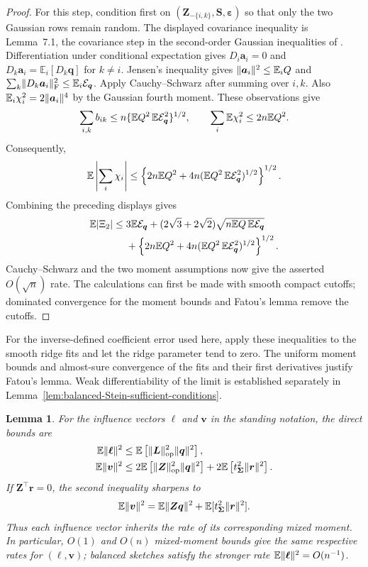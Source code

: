 \documentclass{article}
\theoremstyle{plain}
\newtheorem{lemma}[theorem]{Lemma}
\theoremstyle{definition}
\theoremstyle{definition}
\DeclarePairedDelimiter\norm{\lVert}{\rVert}
\def\E{{\mathbb{E}}}
\def\mathbold{\boldsymbol}
\def\ba{\mathbold{a}}\def\bfa{\mathbold{a}}\def\ahat{\widehat{a}}\def\atil{\widetilde{a}}
\def\bell{\mathbold{\ell}}\def\ellhat{\widehat{\ell}}\def\elltil{\widetilde{\ell}}\def\ellbar{{\overline \ell}}
\def\bL{\mathbold{L}}\def\hbL{{\widehat{\bL}}}\def\tbL{{\widetilde{\bL}}}
\def\bq{\mathbold{q}}\def\qhat{\widehat{q}}\def\qtil{\widetilde{q}}\def\qbar{{\overline q}}
\def\br{\mathbold{r}}\def\rhat{\widehat{r}}\def\rtil{\widetilde{r}}\def\rbar{{\overline r}}
\def\bS{\mathbold{S}}\def\hbS{{\widehat{\bS}}}\def\tbS{{\widetilde{\bS}}}
\def\bv{\mathbold{v}}\def\vhat{\widehat{v}}\def\vtil{\widetilde{v}}\def\vbar{{\overline v}}
\def\bZ{\mathbold{Z}}\def\hbZ{{\widehat{\bZ}}}\def\tbZ{{\widetilde{\bZ}}}
\def\ep{\varepsilon}\def\eps{\epsilon}\def\veps{\varepsilon}
\def\bep{ {\mathbold{\ep} }}
\def\bSigma{\mathbold{\Sigma}}\def\hbSigma{{\widehat{\bSigma}}}
\begin{document}
\begin{proof}
For this step, condition first on
$(\bZ_{-\{i,k\}},\bS,\bep)$ so that only the two Gaussian rows remain
random. The displayed covariance inequality is Lemma~7.1, the covariance step in the second-order Gaussian
inequalities of \citet{bellec2023out}.  Differentiation under conditional
expectation gives
$D_i\ba_i=0$ and $D_k\ba_i=\E_i[D_k\bq]$ for $k\ne i$.  Jensen's inequality
gives $\norm{\ba_i}^2\leq\E_i Q$ and
$\sum_k\norm{D_k\ba_i}_{\rm F}^2\leq\E_i\calE_{\bq}$.
Apply Cauchy--Schwarz after summing over $i,k$.
Also $\E_i\chi_i^2=2\norm{\ba_i}^4$ by the Gaussian fourth moment.
These observations give
\begin{align*}
    \sum_{i,k}b_{ik}
       \leq n\{\E Q^2\,\E\calE_{\bq}^2\}^{1/2},
    \qquad
    \sum_i\E\chi_i^2\leq2n\E Q^2.
\end{align*}
Consequently,
\begin{align*}
    \E\left|\sum_i\chi_i\right|
    \leq
    \left\{2n\E Q^2
       +4n(\E Q^2\,\E\calE_{\bq}^2)^{1/2}\right\}^{1/2}.
\end{align*}
Combining the preceding displays gives
\begin{align*}
    \E|\Xi_2|
    \leq{}&3\E\calE_{\bq}
       +(2\sqrt3+2\sqrt2)\sqrt{n\E Q\,\E\calE_{\bq}}\\
       &+\left\{2n\E Q^2
       +4n(\E Q^2\,\E\calE_{\bq}^2)^{1/2}\right\}^{1/2}.
\end{align*}
Cauchy--Schwarz and the two moment assumptions now give the asserted
$O(\sqrt n)$ rate. The calculations can first be made with smooth compact
cutoffs; dominated convergence for the moment bounds and Fatou's lemma
remove the cutoffs.
\end{proof}

For the inverse-defined coefficient error used here, apply these inequalities
to the smooth ridge fits and let the ridge parameter tend to zero. The
uniform moment bounds and almost-sure convergence of the fits and their
first derivatives justify Fatou's lemma. Weak differentiability of the limit
is established separately in
Lemma~\ref{lem:balanced-Stein-sufficient-conditions}.

\begin{lemma}
\label{lem:influence-from-moments}
For the influence vectors $\bell$ and $\bv$ in the standing notation, the
direct bounds are
\begin{align*}
    \E\norm{\bell}^2
    &\leq\E\left[\norm{\bL}_{\rm op}^2\norm{\bq}^2\right],\\
    \E\norm{\bv}^2
    &\leq2\E\left[\norm{\bZ}_{\rm op}^2\norm{\bq}^2\right]
       +2\E\left[t_{\bSigma}^2\norm{\br}^2\right].
\end{align*}
If $\bZ^\top\br=0$, the second inequality sharpens to
\begin{align*}
    \E\norm{\bv}^2
    =\E\norm{\bZ\bq}^2+\E[t_{\bSigma}^2\norm{\br}^2].
\end{align*}
Thus each influence vector inherits the rate of its corresponding mixed
moment.  In particular, $O(1)$ and $O(n)$ mixed-moment bounds give the same
respective rates for $(\bell,\bv)$; balanced sketches satisfy the stronger
rate $\E\norm{\bell}^2=O(n^{-1})$.
\end{lemma}
\end{document}
